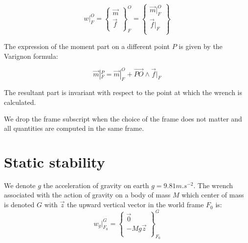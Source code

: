 \begin{equation}
  w|_F^O = \left\{ \begin{array}{r}
    \vec{m}\\
    \vec{f}\\
  \end{array} \right\}^O_F
  = \left\{ \begin{array}{r}
    \vec{m}|_F^O\\
    \vec{f}|_F\\
  \end{array}\right\}
\end{equation}

The expression of the moment part on a different point $P$ is given by the Varignon formula:

\begin{equation}
  \vec{m}|_F^P = \vec{m}|_F^O + \overrightarrow{PO} \wedge \vec{f}|_F
\end{equation}

The resultant part is invariant with respect to the point at which the wrench is calculated.

We drop the frame subscript when the choice of the frame does not matter and all quantities are computed in the same frame.



\section{Static stability}
\label{sec:static_stability}


We denote $g$ the acceleration of gravity on earth $g = 9.81 m.s^{-2}$.
The wrench associated with the action of gravity on a body of mass $M$ which center of mass is denoted $G$ with $\vec{z}$ the upward vertical vector in the world frame $F_0$ is:
\begin{equation}
  w_g|^G_{F_0} = \left\{ \begin{array}{r}
     \vec{0} \\
     -Mg\vec{z} \\
 \end{array}\right\}^G_{F_0}
\end{equation}

